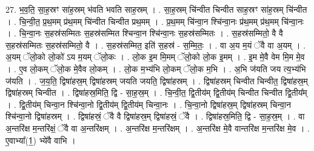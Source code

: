 \documentclass[17pt]{extarticle}
\begin{document}
27. भ॒व॒ति॒ सा॒ह॒स्रꣳ सा॑ह॒स्रम् भ॑वति भवति साह॒स्रम् । . सा॒ह॒स्रम् चि॑न्वीत चिन्वीत साह॒स्रꣳ सा॑ह॒स्रम् चि॑न्वीत । . चि॒न्वी॒त॒ प्र॒थ॒मम् प्र॑थ॒मम् चि॑न्वीत चिन्वीत प्रथ॒मम् । . प्र॒थ॒मम् चि॑न्वा॒न श्चि॑न्वा॒नः प्र॑थ॒मम् प्र॑थ॒मम् चि॑न्वा॒नः । . चि॒न्वा॒नः स॒हस्र॑सम्मितः स॒हस्र॑सम्मित श्चिन्वा॒न श्चि॑न्वा॒नः स॒हस्र॑सम्मितः । . स॒हस्र॑सम्मितो॒ वै वै स॒हस्र॑सम्मितः स॒हस्र॑सम्मितो॒ वै । . स॒हस्र॑सम्मित॒ इति॑ स॒हस्र॑ - स॒म्मि॒तः॒ । . वा अ॒य म॒यं ॅवै वा अ॒यम् । . अ॒यम् ॅलो॒को लो॒को॑ ऽय म॒यम् ॅलो॒कः । . लो॒क इ॒म मि॒मम् ॅलो॒को लो॒क इ॒मम् । . इ॒म मे॒वै वेम मि॒म मे॒व । . ए॒व लो॒कम् ॅलो॒क मे॒वैव लो॒कम् । . लो॒क म॒भ्य॑भि लो॒कम् ॅलो॒क म॒भि । . अ॒भि ज॑यति जय त्य॒भ्य॑भि ज॑यति । . ज॒य॒ति॒ द्विषा॑हस्र॒म् द्विषा॑हस्रम् जयति जयति॒ द्विषा॑हस्रम् । . द्विषा॑हस्रम् चिन्वीत चिन्वीत॒ द्विषा॑हस्र॒म् द्विषा॑हस्रम् चिन्वीत । . द्विषा॑हस्र॒मिति॒ द्वि - सा॒ह॒स्र॒म् । . चि॒न्वी॒त॒ द्वि॒तीय॑म् द्वि॒तीय॑म् चिन्वीत चिन्वीत द्वि॒तीय᳚म् । . द्वि॒तीय॑म् चिन्वा॒न श्चि॑न्वा॒नो द्वि॒तीय॑म् द्वि॒तीय॑म् चिन्वा॒नः । . चि॒न्वा॒नो द्विषा॑हस्र॒म् द्विषा॑हस्रम् चिन्वा॒न श्चि॑न्वा॒नो द्विषा॑हस्रम् । . द्विषा॑हस्रं॒ ॅवै वै द्विषा॑हस्र॒म् द्विषा॑हस्रं॒ ॅवै । . द्विषा॑हस्र॒मिति॒ द्वि - सा॒ह॒स्र॒म् । . वा अ॒न्तरि॑क्ष म॒न्तरि॑क्षं॒ ॅवै वा अ॒न्तरि॑क्षम् । . अ॒न्तरि॑क्ष म॒न्तरि॑क्षम् । . अ॒न्तरि॑क्ष मे॒वै वान्तरि॑क्ष म॒न्तरि॑क्ष मे॒व । . ए॒वाभ्या᳚(1॒) भ्ये॑वै वाभि । \newline
\end{document}

